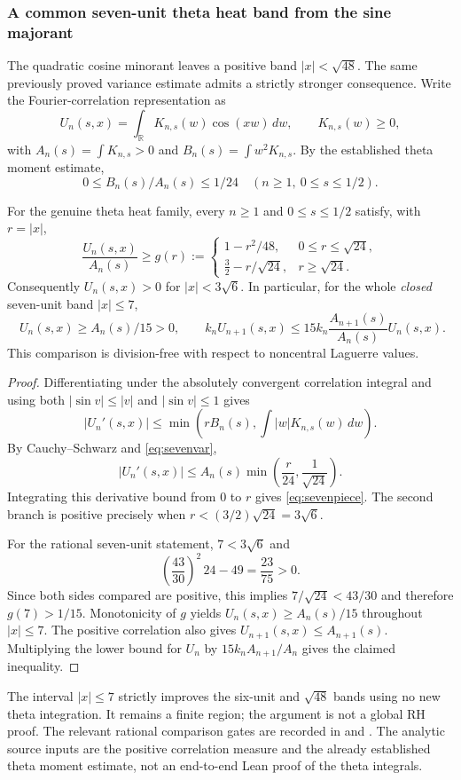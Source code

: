 \subsubsection{A common seven-unit theta heat band from the sine majorant}
\label{subsec:sevenunit}
The quadratic cosine minorant leaves a positive band
$|x|<\sqrt{48}$. The same previously proved variance
estimate admits a strictly stronger consequence.
Write the Fourier-correlation representation as
\[
U_n(s,x)=\int_{\mathbb R}K_{n,s}(w)\cos(xw)\,dw,
\qquad K_{n,s}(w)\ge0,
\]
with $A_n(s)=\int K_{n,s}>0$ and
$B_n(s)=\int w^2K_{n,s}$.
By the established theta moment estimate,
\begin{equation}\label{eq:sevenvar}
0\le B_n(s)/A_n(s)\le1/24
\quad(n\ge1,\ 0\le s\le1/2).
\end{equation}

\begin{theorem}
\label{thm:sevenunit}
For the genuine theta heat family, every $n\ge1$
and $0\le s\le1/2$ satisfy, with $r=|x|$,
\begin{equation}\label{eq:sevenpiece}
\frac{U_n(s,x)}{A_n(s)}
\ge g(r):=
\begin{cases}
1-r^2/48,&0\le r\le\sqrt{24},\\[2pt]
\frac32-r/\sqrt{24},&r\ge\sqrt{24}.
\end{cases}
\end{equation}
Consequently $U_n(s,x)>0$ for
$|x|<3\sqrt6$.
In particular, for the whole \emph{closed}
seven-unit band $|x|\le7$,
\[
\boxed{\quad U_n(s,x)\ge A_n(s)/15>0,\qquad
k_n U_{n+1}(s,x)\le
15k_n\frac{A_{n+1}(s)}{A_n(s)}U_n(s,x).\quad}
\]
This comparison is division-free with respect
to noncentral Laguerre values.
\end{theorem}
\begin{proof}
Differentiating under the absolutely convergent
correlation integral and using both
$|\sin v|\le |v|$ and $|\sin v|\le1$ gives
\[
|U_n'(s,x)|\le
\min\!\left(rB_n(s),\int|w|K_{n,s}(w)\,dw\right).
\]
By Cauchy--Schwarz and \eqref{eq:sevenvar},
\[
|U_n'(s,x)|\le A_n(s)
\min\!\left(\frac r{24},\frac1{\sqrt{24}}\right).
\]
Integrating this derivative bound from $0$
to $r$ gives \eqref{eq:sevenpiece}.
The second branch is positive precisely when
$r<(3/2)\sqrt{24}=3\sqrt6$.

For the rational seven-unit statement,
$7<3\sqrt6$ and
\[
\left(\frac{43}{30}\right)^2\,24-49
=\frac{23}{75}>0.
\]
Since both sides compared are positive,
this implies
$7/\sqrt{24}<43/30$ and therefore
$g(7)>1/15$.
Monotonicity of $g$ yields
$U_n(s,x)\ge A_n(s)/15$ throughout
$|x|\le7$. The positive correlation
also gives $U_{n+1}(s,x)\le A_{n+1}(s)$.
Multiplying the lower bound for $U_n$
by $15k_nA_{n+1}/A_n$ gives the
claimed inequality.
\end{proof}
The interval $|x|\le7$ strictly improves the
six-unit and $\sqrt{48}$ bands using no
new theta integration. It remains a finite
region; the argument is not a global RH proof.
The relevant rational comparison gates are
recorded in
and .
The analytic source inputs are the positive
correlation measure and the already established
theta moment estimate, not an end-to-end Lean
proof of the theta integrals.
